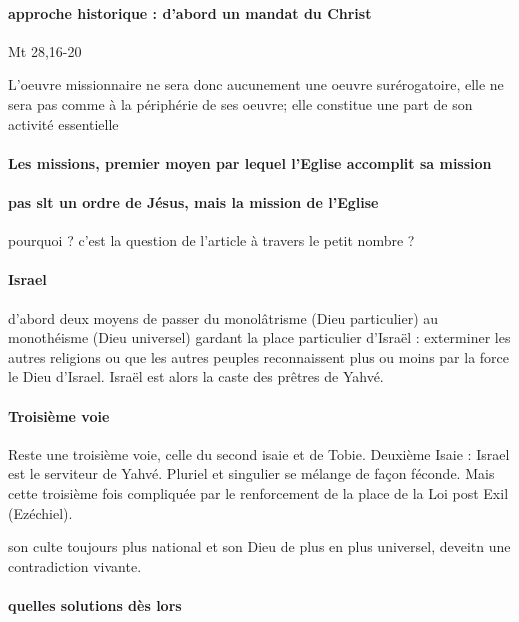 \paragraph{approche historique : d'abord un mandat du Christ} Mt 28,16-20


\begin{singlequote}
    L'oeuvre missionnaire ne sera donc aucunement une oeuvre surérogatoire, elle ne sera pas comme à la périphérie de ses oeuvre; elle constitue une part de son activité essentielle
\end{singlequote}

\paragraph{Les missions, premier moyen par lequel l'Eglise accomplit sa mission}

\paragraph{pas slt un ordre de Jésus, mais la mission de l'Eglise} pourquoi ? c'est la question de l'article à travers le petit nombre ?

\paragraph{Israel} d'abord deux moyens de passer du monolâtrisme (Dieu particulier) au monothéisme (Dieu universel) gardant la place particulier d'Israël : exterminer les autres religions ou que les autres peuples reconnaissent plus ou moins par la force le Dieu d'Israel. Israël est alors la caste des prêtres de Yahvé.

\paragraph{Troisième voie }Reste une troisième voie, celle du second isaie et de Tobie. Deuxième Isaie : Israel est le serviteur de Yahvé. Pluriel et singulier se mélange de façon féconde. Mais cette troisième fois compliquée par le renforcement de la place de la Loi post Exil (Ezéchiel). 
\begin{singlequote}
    son culte toujours plus national et son Dieu de plus en plus universel, deveitn une contradiction vivante.
\end{singlequote}

\paragraph{quelles solutions dès lors}

